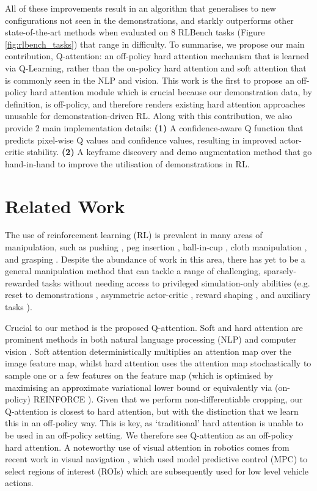 \documentclass[letterpaper, 10 pt, journal, twoside]{IEEEtran}
\begin{document}
All of these improvements result in an algorithm that generalises to new configurations not seen in the demonstrations, and starkly outperforms other state-of-the-art methods when evaluated on 8 RLBench \cite{james2019rlbench} tasks (Figure \ref{fig:rlbench_tasks}) that range in difficulty. To summarise, we propose our main contribution, Q-attention: an off-policy hard attention mechanism that is learned via Q-Learning, rather than the on-policy hard attention and soft attention that is commonly seen in the NLP and vision. This work is the first to propose an off-policy hard attention module which is crucial because our demonstration data, by definition, is off-policy, and therefore renders existing hard attention approaches unusable for demonstration-driven RL. Along with this contribution, we also provide 2 main implementation details: \textbf{(1)} A confidence-aware Q function that predicts pixel-wise Q values and confidence values, resulting in improved actor-critic stability. \textbf{(2)} A keyframe discovery and demo augmentation method that go hand-in-hand to improve the utilisation of demonstrations in RL.

\section{Related Work}

The use of reinforcement learning (RL) is prevalent in many areas of manipulation, such as pushing \cite{finn2017deep}, peg insertion \cite{zeng2018learning}, ball-in-cup \cite{kober2009policy}, cloth manipulation \cite{matas2018sim}, and grasping \cite{kalashnikov2018qt, james2019sim}. Despite the abundance of work in this area, there has yet to be a general manipulation method that can tackle a range of challenging, sparsely-rewarded tasks without needing access to privileged simulation-only abilities (e.g. reset to demonstrations \cite{nair2018overcoming}, asymmetric actor-critic \cite{pinto2017asymmetric}, reward shaping \cite{james20163d, rajeswaran2017learning}, and auxiliary tasks \cite{james2017transferring}).

Crucial to our method is the proposed Q-attention. Soft and hard attention are prominent methods in both natural language processing (NLP) \cite{bahdanau2014neural, vaswani2017attention, devlin2018bert} and computer vision \cite{xu2015show, zhang2019self}. Soft attention deterministically multiplies an attention map over the image feature map, whilst hard attention uses the attention map stochastically to sample one or a few features on the feature map (which is optimised by maximising an approximate variational lower bound or equivalently via (on-policy) REINFORCE \cite{williams1992simple}). Given that we perform non-differentiable cropping, our Q-attention is closest to hard attention, but with the distinction that we learn this in an off-policy way. This is key, as `traditional' hard attention is unable to be used in an off-policy setting. We therefore see Q-attention as an off-policy hard attention. A noteworthy use of visual attention in robotics comes from recent work in visual navigation \cite{lee2020perceptual}, which used model predictive control (MPC) to select regions of interest (ROIs) which are subsequently used for low level vehicle actions.
\end{document}
